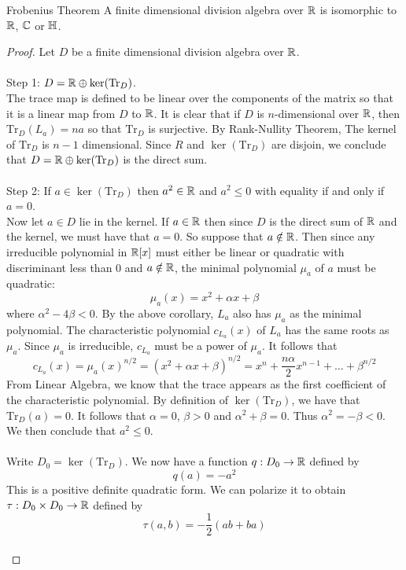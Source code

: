 \documentclass[a4paper]{article}
\begin{document}
\begin{thm}{Frobenius Theorem}{} A finite dimensional division algebra over $\mathbb{R}$ is isomorphic to $\mathbb{R}$, $\mathbb{C}$ or $\mathbb{H}$. \tcbline
\begin{proof}
Let $D$ be a finite dimensional division algebra over $\mathbb{R}$. \\~\\

Step 1: $D=\mathbb{R}\oplus\ker(\text{Tr}_D)$. \\
The trace map is defined to be linear over the components of the matrix so that it is a linear map from $D$ to $\mathbb{R}$. It is clear that if $D$ is $n$-dimensional over $\mathbb{R}$, then $\text{Tr}_D(L_a)=na$ so that $\text{Tr}_D$ is surjective. By Rank-Nullity Theorem, The kernel of $\text{Tr}_D$ is $n-1$ dimensional. Since $R$ and $\ker(\text{Tr}_D)$ are disjoin, we conclude that $D=\mathbb{R}\oplus\ker(\text{Tr}_D)$ is the direct sum. \\~\\

Step 2: If $a\in\ker(\text{Tr}_D)$ then $a^2\in\mathbb{R}$ and $a^2\leq 0$ with equality if and only if $a=0$. \\
Now let $a\in D$ lie in the kernel. If $a\in\mathbb{R}$ then since $D$ is the direct sum of $\mathbb{R}$ and the kernel, we must have that $a=0$. So suppose that $a\notin\mathbb{R}$. Then since any irreducible polynomial in $\mathbb{R}[x]$ must either be linear or quadratic with discriminant less than $0$ and $a\notin\mathbb{R}$, the minimal polynomial $\mu_a$ of $a$ must be quadratic: $$\mu_a(x)=x^2+\alpha x+\beta$$ where $\alpha^2-4\beta<0$. By the above corollary, $L_a$ also has $\mu_a$ as the minimal polynomial. The characteristic polynomial $c_{L_a}(x)$ of $L_a$ has the same roots as $\mu_a$. Since $\mu_a$ is irreducible, $c_{L_a}$ must be a power of $\mu_a$. It follows that $$c_{L_a}(x)=\mu_a(x)^{n/2}=(x^2+\alpha x+\beta)^{n/2}=x^n+\frac{n\alpha}{2}x^{n-1}+\dots+\beta^{n/2}$$ From Linear Algebra, we know that the trace appears as the first coefficient of the characteristic polynomial. By definition of $\ker(\text{Tr}_D)$, we have that $\text{Tr}_D(a)=0$. It follows that $\alpha=0$, $\beta>0$ and $\alpha^2+\beta=0$. Thus $\alpha^2=-\beta<0$. We then conclude that $a^2\leq 0$. \\~\\

Write $D_0=\ker(\text{Tr}_D)$. We now have a function $q:D_0\to\mathbb{R}$ defined by $$q(a)=-a^2$$ This is a positive definite quadratic form. We can polarize it to obtain $\tau:D_0\times D_0\to\mathbb{R}$ defined by $$\tau(a,b)=-\frac{1}{2}(ab+ba)$$~\\


\end{proof}
\end{thm}
\end{document}
